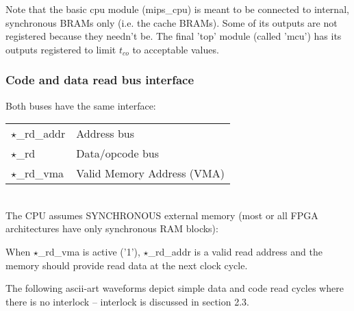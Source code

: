 \documentclass[11pt]{article}
\begin{document}
    Note that the basic cpu module (mips\_cpu) is meant to be connected to 
    internal, synchronous BRAMs only (i.e. the cache BRAMs). Some of its 
    outputs are not registered because they needn't be. The final 'top' module 
    (called 'mcu') has its outputs registered to limit $t_{co}$ to 
    acceptable values.\\

    

\subsubsection{Code and data read bus interface}
\label{code_data_buses}
    Both buses have the same interface:\\
    
\begin{tabular}{ l l }
    $\star$\_rd\_addr  & Address bus\\ 
    $\star$\_rd        & Data/opcode bus\\ 
    $\star$\_rd\_vma   & Valid Memory Address (VMA)\\ 
\end{tabular}\\

    The CPU assumes SYNCHRONOUS external memory (most or all FPGA architectures
    have only synchronous RAM blocks):

    When $\star$\_rd\_vma is active ('1'), $\star$\_rd\_addr is a valid read address and the
    memory should provide read data at the next clock cycle.

    The following ascii-art waveforms depict simple data and code read cycles
    where there is no interlock -- interlock is discussed in section 2.3.\\
    
\end{document}
